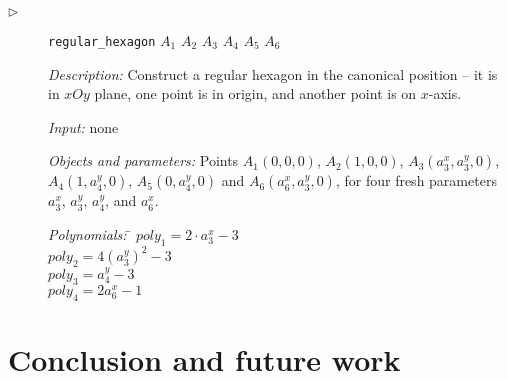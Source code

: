 \documentclass[final,1p,times,authoryear]{elsarticle}
\begin{document}
\begin{description}
\item[$\triangleright$] {\tt regular\_hexagon} $A_1$ $A_2$ $A_3$ $A_4$ $A_5$ $A_6$

  {\em Description:} Construct a regular hexagon in the canonical
  position -- it is in $xOy$ plane, one point is in origin, and
  another point is on $x$-axis. 
  
  {\em Input:} none

  {\em Objects and parameters:} Points $A_1(0, 0, 0)$, $A_2(1, 0, 0)$,
  $A_3(a_3^x, a_3^y, 0)$, $A_4(1, a_4^y, 0)$, $A_5(0, a_4^y, 0)$ and
  $A_6(a_6^x, a_3^y, 0)$, for four fresh parameters $a_3^x$, $a_3^y$,
  $a_4^y$, and $a_6^x$.

\begin{tabbing}
{\em Polynomials:} \= $poly_1 = 2\cdot a_3^x - 3$ \\
                   \> $poly_2 = 4(a_3^y)^2 - 3$ \\
                   \> $poly_3 = a_4^y - 3$ \\
                   \> $poly_4 = 2a_6^x - 1$
\end{tabbing}

\end{description}
\section{Conclusion and future work}




\end{document}
